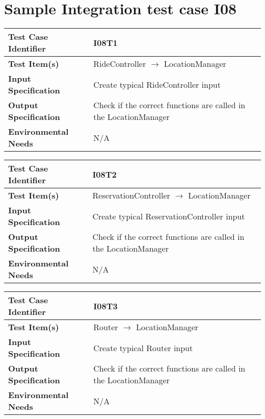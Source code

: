 \section{Sample Integration test case I08}\label{I08}
\begin{center}
	\vspace{0.6cm}
	\begin{tabular}{|l|l|}
		\hline
		\textbf{Test Case Identifier} & I08T1 \bigstrut \\\hline
		\textbf{Test Item(s)} & RideController \ensuremath{\rightarrow} LocationManager \bigstrut \\\hline
		\textbf{Input Specification} & Create typical RideController input \bigstrut \\\hline
		\textbf{Output Specification} & Check if the correct functions are called in the LocationManager \bigstrut \\\hline
		\textbf{Environmental Needs} & N/A \bigstrut \\\hline
	\end{tabular}
\end{center}

\begin{center}
	\vspace{0.6cm}
	\begin{tabular}{|l|l|}
		\hline
		\textbf{Test Case Identifier} & I08T2 \bigstrut \\\hline
		\textbf{Test Item(s)} & ReservationController \ensuremath{\rightarrow} LocationManager \bigstrut \\\hline
		\textbf{Input Specification} & Create typical ReservationController input \bigstrut \\\hline
		\textbf{Output Specification} & Check if the correct functions are called in the LocationManager \bigstrut \\\hline
		\textbf{Environmental Needs} & N/A \bigstrut \\\hline
	\end{tabular}
\end{center}

\begin{center}
	\vspace{0.6cm}
	\begin{tabular}{|l|l|}
		\hline
		\textbf{Test Case Identifier} & I08T3 \bigstrut \\\hline
		\textbf{Test Item(s)} & Router \ensuremath{\rightarrow} LocationManager \bigstrut \\\hline
		\textbf{Input Specification} & Create typical Router input \bigstrut \\\hline
		\textbf{Output Specification} & Check if the correct functions are called in the LocationManager \bigstrut \\\hline
		\textbf{Environmental Needs} & N/A \bigstrut \\\hline
	\end{tabular}
\end{center}

